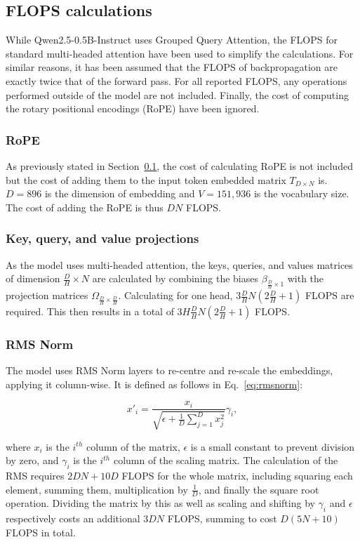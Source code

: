 \documentclass[11pt,a4paper]{article}
\begin{document}
\subsection{FLOPS calculations}
\label{sec:flops_calc}
While Qwen2.5-0.5B-Instruct uses Grouped Query Attention, the FLOPS for standard multi-headed attention have been used to simplify the calculations. For similar reasons, it has been assumed that the FLOPS of backpropagation are exactly twice that of the forward pass. For all reported FLOPS, any operations performed outside of the model are not included. Finally, the cost of computing the rotary positional encodings (RoPE) have been ignored.

\subsubsection{RoPE}
As previously stated in Section~\ref{sec:flops_calc}, the cost of calculating RoPE is not included but the cost of adding them to the input token embedded matrix $T_{D \times N}$ is. $D=896$ is the dimension of embedding and $V=151,936$ is the vocabulary size. The cost of adding the RoPE is thus $DN$ FLOPS.

\subsubsection{Key, query, and value projections}
As the model uses multi-headed attention, the keys, queries, and values matrices of dimension $\frac{D}{H}\times N$ are calculated by combining the biases $\beta_{\frac{D}{H} \times 1}$ with the projection matrices $\Omega_{\frac{D}{H}\times\frac{D}{H}}$. Calculating for one head, $3\frac{D}{H}N(2\frac{D}{H} + 1)$ FLOPS are required. This then results in a total of $3H\frac{D}{H}N(2\frac{D}{H} + 1)$ FLOPS.

\subsubsection{RMS Norm}
The model uses RMS Norm layers to re-centre and re-scale the embeddings, applying it column-wise. It is defined as follows in Eq.~\ref{eq:rmsnorm}:

\begin{equation}
    x'_i = \frac{x_i}{\sqrt{\epsilon + \frac{1}{D}\sum^D_{j=1}x_j^2}} \gamma_i,
    \label{eq:rmsnorm}
\end{equation}

where $x_i$ is the $i^{th}$ column of the matrix, $\epsilon$ is a small constant to prevent division by zero, and $\gamma_i$ is the $i^{th}$ column of the scaling matrix. The calculation of the RMS requires $2DN + 10D$ FLOPS for the whole matrix, including squaring each element, summing them, multiplication by $\frac{1}{D}$, and finally the square root operation. Dividing the matrix by this as well as scaling and shifting by $\gamma_i$ and $\epsilon$ respectively costs an additional $3DN$ FLOPS, summing to cost $D(5N +10)$ FLOPS in total.
\end{document}

